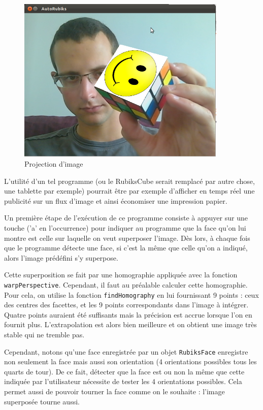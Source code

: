 \documentclass[a4paper,11pt]{article}
\begin{document}
\begin{figure}[h]
\begin{center}
 \includegraphics[width=10cm]{smiley.png} 
\end{center}
 \caption{Projection d'image}
 \label{Projection d'image}
\end{figure}

L'utilité d'un tel programme (ou le RubiksCube serait remplacé par autre chose, une tablette par exemple)
pourrait être par exemple d'afficher en temps réel une publicité sur un flux d'image et ainsi économiser une
impression papier.

Un première étape de l'exécution de ce programme consiste à appuyer sur une touche ('a' en l'occurrence) pour
indiquer au programme que la face qu'on lui montre est celle sur laquelle on veut superposer l'image. Dès lors,
à chaque
fois que le programme détecte une face, si c'est la même que celle qu'on a indiqué, alors l'image prédéfini
s'y superpose.

Cette superposition se fait par une homographie appliquée avec la fonction \verb|warpPerspective|. Cependant,
il faut au préalable calculer cette homographie. Pour cela, on utilise la fonction \verb|findHomography| en lui
fournissant 9 points : ceux des centres des facettes, et les 9 points correspondants dans l'image à intégrer.
Quatre points auraient été suffisants mais la précision est accrue lorsque l'on en fournit plus. L'extrapolation
est alors bien meilleure et on obtient une image très stable qui ne tremble pas.

Cependant, notons qu'une face enregistrée par un objet \verb|RubiksFace| enregistre non seulement la face mais aussi 
son orientation (4 orientations possibles tous les quarts de tour). De ce fait, détecter que la face est ou
non la même que cette indiquée par l'utilisateur nécessite de tester les 4 orientations possibles. Cela permet
aussi de pouvoir tourner la face comme on le souhaite : l'image superposée tourne aussi. 
\end{document}
